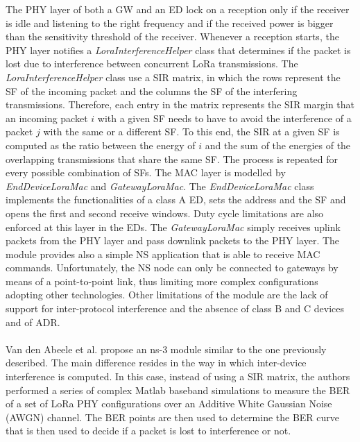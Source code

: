The PHY layer of both a \gls{GW} and an \gls{ED} lock on a reception only if the receiver is idle and listening to the right frequency and if the received power is bigger than the sensitivity threshold of the receiver. Whenever a reception starts, the PHY layer notifies a \textit{LoraInterferenceHelper} class that determines if the packet is lost due to interference between concurrent LoRa transmissions. The \textit{LoraInterferenceHelper} class use a \gls{SIR} matrix, in which the rows represent the \gls{SF} of the incoming packet and the columns the \gls{SF} of the interfering transmissions. Therefore, each entry in the matrix represents the \gls{SIR} margin that an incoming packet $i$ with a given \gls{SF} needs to have to avoid the interference of a packet $j$ with the same or a different \gls{SF}. To this end, the \gls{SIR} at a given \gls{SF} is computed as the ratio between the energy of $i$ and the sum of the energies of the overlapping transmissions that share the same \gls{SF}. The process is repeated for every possible combination of \glspl{SF}. The MAC layer is modelled by \textit{EndDeviceLoraMac} and \textit{GatewayLoraMac}. The \textit{EndDeviceLoraMac} class implements the functionalities of a class A \gls{ED}, sets the address and the \gls{SF} and opens the first and second receive windows. Duty cycle limitations are also enforced at this layer in the \glspl{ED}. The \textit{GatewayLoraMac} simply receives uplink packets from the PHY layer and pass downlink packets to the PHY layer. The module provides also a simple \gls{NS} application that is able to receive MAC commands. Unfortunately, the \gls{NS} node can only be connected to gateways by means of a point-to-point link, thus limiting more complex configurations adopting other technologies. Other limitations of the module are the lack of support for inter-protocol interference and the absence of class B and C devices and of \gls{ADR}. \\\\
Van den Abeele et al. \cite{ref:soa-lora-scal4} propose an ns-3 module similar to the one previously described. The main difference resides in the way in which inter-device interference is computed. In this case, instead of using a \gls{SIR} matrix, the authors performed a series of complex Matlab baseband simulations to measure the \gls{BER} of a set of LoRa PHY configurations over an Additive White Gaussian Noise (AWGN) channel. The \gls{BER} points are then used to determine the \gls{BER} curve that is then used to decide if a packet is lost to interference or not. \\\\
